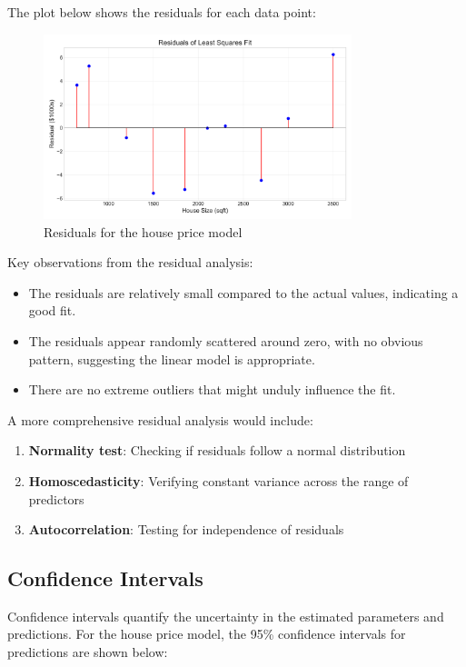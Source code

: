 \documentclass[12pt]{article}
\begin{document}
The plot below shows the residuals for each data point:

\begin{figure}[H]
\centering
\includegraphics[width=0.8\textwidth]{residuals.png}
\caption{Residuals for the house price model}
\label{fig:residuals}
\end{figure}

Key observations from the residual analysis:
\begin{itemize}
    \item The residuals are relatively small compared to the actual values, indicating a good fit.
    \item The residuals appear randomly scattered around zero, with no obvious pattern, suggesting the linear model is appropriate.
    \item There are no extreme outliers that might unduly influence the fit.
\end{itemize}

A more comprehensive residual analysis would include:
\begin{enumerate}
    \item \textbf{Normality test}: Checking if residuals follow a normal distribution
    \item \textbf{Homoscedasticity}: Verifying constant variance across the range of predictors
    \item \textbf{Autocorrelation}: Testing for independence of residuals
\end{enumerate}

\subsection{Confidence Intervals}

Confidence intervals quantify the uncertainty in the estimated parameters and predictions. For the house price model, the 95\% confidence intervals for predictions are shown below:
\end{document}
